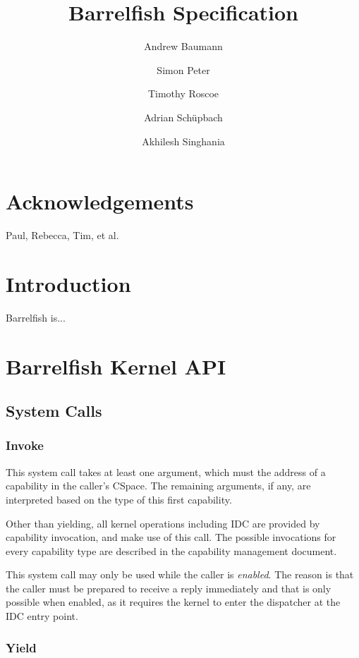 \documentclass{scrreprt}
\title{Barrelfish Specification}
\author{Andrew Baumann \and Simon Peter \and Timothy Roscoe \and
  Adrian Sch\"upbach \and Akhilesh Singhania}
\date{}
\begin{document}
  \maketitle

  \chapter*{Acknowledgements}

  Paul, Rebecca, Tim, et al.

  \cleardoublepage
  \tableofcontents
  \listoftables
  \listoffigures

  \chapter{Introduction}

  Barrelfish is...

  \chapter{Barrelfish Kernel API}

  \section{System Calls}\label{sec:syscalls}

  \subsection{Invoke}\label{sec:sys_invoke}
  
  This system call takes at least one argument, which must the address of a
  capability in the caller's CSpace. The remaining arguments, if any, are
  interpreted based on the type of this first capability.
    
    Other than yielding, all kernel operations including IDC are
    provided by capability invocation, and make use of this call. The
    possible invocations for every capability type are described in
    the capability management document.
    
    This system call may only be used while the caller is
    \emph{enabled}. The reason is that the caller must be prepared to
    receive a reply immediately and that is only possible when
    enabled, as it requires the kernel to enter the dispatcher at the
    IDC entry point.
    
    \subsection{Yield}\label{sec:sys_yield}
    
\end{document}
